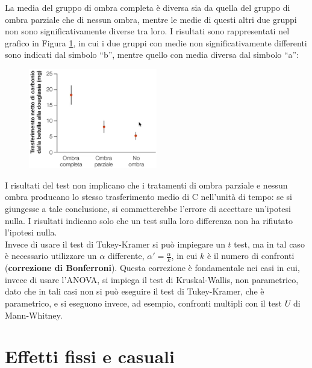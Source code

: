 \documentclass[10pt, draft]{book}
\newcounter{example}[section]
\begin{document}
\begin{example}
\begin{table}[H]
        \label{tabwww4}
    \end{table}\noindent
    La media del gruppo di ombra completa è diversa sia da quella del gruppo di ombra parziale che di nessun ombra, mentre le medie di questi altri due gruppi non sono significativamente diverse tra loro. I risultati sono rappresentati nel grafico in Figura \ref{fig15.4-1}, in cui i due gruppi con medie non significativamente differenti sono indicati dal simbolo ``b'', mentre quello con media diversa dal simbolo ``a'':
    \begin{figure}[H]
        \centering
        \includegraphics[width=0.5\textwidth]{fig15.4-1}
        \caption{\small{}}
        \label{fig15.4-1}
    \end{figure}
    I risultati del test non implicano che i tratamenti di ombra parziale e nessun ombra producano lo stesso trasferimento medio di C nell'unità di tempo: se si giungesse a tale conclusione, si commetterebbe l'errore di accettare un'ipotesi nulla. I risultati indicano solo che un test sulla loro differenza non ha rifiutato l'ipotesi nulla.\\

    Invece di usare il test di Tukey-Kramer si può impiegare un $t$ test, ma in tal caso è necessario utilizzare un $\alpha$ differente, $\alpha' = \frac{\alpha}{k}$, in cui $k$ è il numero di confronti (\textbf{correzione di Bonferroni}). Questa correzione è fondamentale nei casi in cui, invece di usare l'ANOVA, si impiega il test di Kruskal-Wallis, non parametrico, dato che in tali casi non si può eseguire il test di Tukey-Kramer, che è parametrico, e si eseguono invece, ad esempio, confronti multipli con il test $U$ di Mann-Whitney.
\end{example}

\section{Effetti fissi e casuali}
\end{document}
